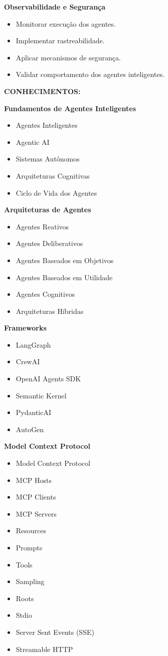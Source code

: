 \textbf{Observabilidade e Segurança}

\begin{itemize}
\item Monitorar execução dos agentes.
\item Implementar rastreabilidade.
\item Aplicar mecanismos de segurança.
\item Validar comportamento dos agentes inteligentes.
\end{itemize}

\textbf{CONHECIMENTOS:}

\textbf{Fundamentos de Agentes Inteligentes}

\begin{itemize}
\item Agentes Inteligentes
\item Agentic AI
\item Sistemas Autônomos
\item Arquiteturas Cognitivas
\item Ciclo de Vida dos Agentes
\end{itemize}

\textbf{Arquiteturas de Agentes}

\begin{itemize}
\item Agentes Reativos
\item Agentes Deliberativos
\item Agentes Baseados em Objetivos
\item Agentes Baseados em Utilidade
\item Agentes Cognitivos
\item Arquiteturas Híbridas
\end{itemize}

\textbf{Frameworks}

\begin{itemize}
\item LangGraph
\item CrewAI
\item OpenAI Agents SDK
\item Semantic Kernel
\item PydanticAI
\item AutoGen
\end{itemize}

\textbf{Model Context Protocol}

\begin{itemize}
\item Model Context Protocol
\item MCP Hosts
\item MCP Clients
\item MCP Servers
\item Resources
\item Prompts
\item Tools
\item Sampling
\item Roots
\item Stdio
\item Server Sent Events (SSE)
\item Streamable HTTP
\end{itemize}
